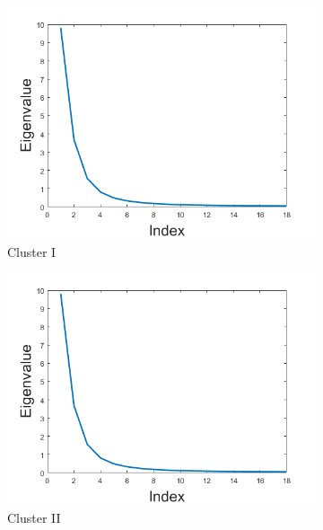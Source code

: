 \begin{figure}[H]
\centering
\begin{subfigure}[b]{0.4\textwidth}
\centering
\includegraphics[width=\textwidth]{figures_2/eig1}
\caption{Cluster I}
\end{subfigure}
\begin{subfigure}[b]{0.4\textwidth}
\centering
\includegraphics[width=\textwidth]{figures_2/eig2}
\caption{Cluster II}
\end{subfigure}  \\
\begin{subfigure}[b]{0.4\textwidth}
\centering

\end{subfigure}
\end{figure}
